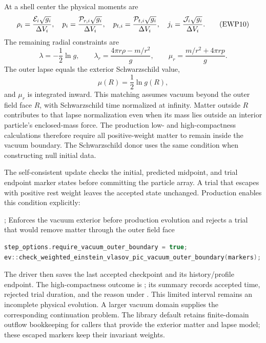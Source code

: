 At a shell center the physical moments are
\[
 \rho_i=\frac{{\cal E}_i\sqrt{g_i}}{\Delta V_i},\quad
 p_i=\frac{{\cal P}_{r,i}\sqrt{g_i}}{\Delta V_i},\quad
 p_{t,i}=\frac{{\cal P}_{t,i}\sqrt{g_i}}{\Delta V_i},\quad
 j_i=\frac{{\cal J}_i\sqrt{g_i}}{\Delta V_i}.            \tag{EWP10}
\]
The remaining radial constraints are
\[
\lambda=-\frac12\ln g,\qquad
\lambda_r=\frac{4\pi r\rho-m/r^2}{g},\qquad
\mu_r=\frac{m/r^2+4\pi rp}{g}.                           \tag{EWP11}
\]
The outer lapse equals the exterior Schwarzschild value,
\[
 \mu(R)=\frac12\ln g(R),                                 \tag{EWP12}
\]
and \(\mu_r\) is integrated inward.  This matching assumes vacuum beyond
the outer field face \(R\), with Schwarzschild time normalized at infinity.
Matter outside \(R\) contributes to that lapse normalization even when its
mass lies outside an interior particle's enclosed-mass force.  The production
low- and high-compactness calculations therefore require all positive-weight
matter to remain inside the vacuum boundary.  The Schwarzschild donor uses
the same condition when constructing null initial data.

The self-consistent update checks the initial, predicted midpoint, and trial
endpoint marker states before committing the particle array.  A trial that
escapes with positive rest weight leaves the accepted state unchanged.
Production enables this condition explicitly:
\par\noindent\begin{minipage}{\linewidth}
{;
 }
{Enforces the vacuum exterior before production evolution and rejects a trial
 that would remove matter through the outer field face}
\begin{lstlisting}[language=C++]
step_options.require_vacuum_outer_boundary = true;
ev::check_weighted_einstein_vlasov_pic_vacuum_outer_boundary(markers);
\end{lstlisting}
\end{minipage}\par
The driver then saves the last accepted checkpoint and its history/profile
endpoint.  The high-compactness outcome is
; its summary records accepted time,
rejected trial duration, and the reason under
.  This limited interval remains an
incomplete physical evolution.  A larger vacuum domain supplies the
corresponding continuation problem.  The library default retains finite-domain
outflow bookkeeping for callers that provide the exterior matter and lapse
model; these escaped markers keep their invariant weights.


